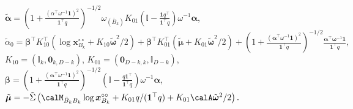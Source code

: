 \documentclass[12pt]{article}
\begin{document}
\begin{lemma}
$\tilde{\bm\alpha}=\left(1 + \frac{\left(\alpha^\top\omega^{-1}\bm 1\right)^2}{\bm 1^\top q}\right)^{-1/2}\omega_{(\bar B_k)} K_{01}\left(\mathbb{I} - \frac{\bm 1 q^\top}{\bm 1^\top q}\right)\omega^{-1}\bm\alpha$,
$\tilde\alpha_0 = \bm\beta^\top K_{10}^\top(\log \bm x_{B_k}^{\circ\circ}+K_{10}\tilde{\bm\omega}^2/2) + \bm\beta^\top K_{01}^\top(\tilde{\bm\mu} + K_{01}\tilde{\bm\omega}^2/2) +  \left(1 + \frac{(\bm\alpha^\top\omega^{-1}\bm 1)^2}{\bm 1^\top q}\right)^{-1/2}\frac{\bm\alpha^\top\bm\omega^{-1}\bm 1}{\bm 1^\top q},$ 
$K_{10} = (\mathbb I_{k},\bm 0_{k,D-k})$, 
$K_{01} = (\bm 0_{D-k,k},\mathbb I_{D-k})$, 
$\bm\beta = \left(1 + \frac{(\bm\alpha^\top\omega^{-1}\bm 1)^2}{\bm 1^\top q}\right)^{-1/2}\left(\mathbb I - \frac{q\bm 1^\top}{\bm 1^\top q}\right)\omega^{-1}\bm\alpha$, $\tilde{\bm\mu} = -\tilde\Sigma\left(\calM_{\bar B_kB_k}\log \bm x_{B_k}^{\circ\circ} + K_{01}q/(\bm 1^\top q)+K_{01}\calA\tilde{\bm\omega}^2/2\right).$
\end{lemma}
\end{document}
